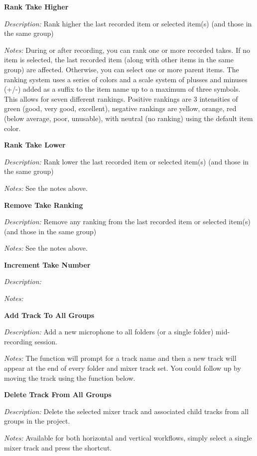 \documentclass[10pt,american]{article}
\begin{document}
\textbf{Rank Take Higher }\keys{\ctrl+=}

\emph{Description:} Rank higher the last recorded item or selected item(s) (and
those in the same group)

\emph{Notes:} During or after recording, you can rank one or more recorded
takes. If no item is selected, the last recorded item (along with other items in
the same group) are affected. Otherwise, you can select one or more parent
items. The ranking system uses a series of colors and a scale system of plusses
and minuses (+/-) added as a suffix to the item name up to a maximum of three
symbols. This allows for seven different rankings. Positive rankings are 3
intensities of green (good, very good, excellent), negative rankings are yellow,
orange, red (below average, poor, unusable), with neutral (no ranking) using the
default item color.

\textbf{Rank Take Lower }\keys{\ctrl+-}

\emph{Description:} Rank lower the last recorded item or selected item(s) (and
those in the same group)

\emph{Notes: }See the notes above.

\textbf{Remove Take Ranking }

\emph{Description:} Remove any ranking from the last recorded item or selected
item(s) (and those in the same group)

\emph{Notes: }See the notes above.

\textbf{Increment Take Number }

\emph{Description:} 

\emph{Notes:} 

\textbf{Add Track To All Groups }

\emph{Description:} Add a new microphone to all folders (or a single folder)
mid-recording session.

\emph{Notes:} The function will prompt for a track name and then a new track
will appear at the end of every folder and mixer track set. You could follow up
by moving the track using the function below.

\textbf{Delete Track From All Groups }\keys{\ctrl+\shift+\del}

\emph{Description:} Delete the selected mixer track and associated child tracks
from all groups in the project.

\emph{Notes:} Available for both horizontal and vertical workflows, simply
select a single mixer track and press the shortcut.
\end{document}
